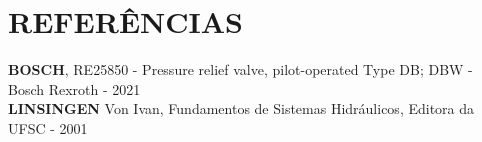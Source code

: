 \section*{REFERÊNCIAS}
\vspace{0.5cm}


\textbf{BOSCH}, RE25850 - Pressure relief valve, pilot-operated Type DB; DBW - Bosch Rexroth - 2021 \\

\textbf{LINSINGEN} Von Ivan, Fundamentos de Sistemas Hidráulicos, Editora da UFSC - 2001 \\

